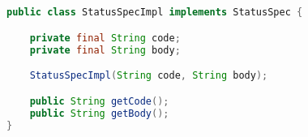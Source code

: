 \subsection{}

\begin{lstlisting}[language=Java]
public class StatusSpecImpl implements StatusSpec {

    private final String code;
    private final String body;

    StatusSpecImpl(String code, String body);

    public String getCode();
    public String getBody();
}
\end{lstlisting}

\section{}
\section{}

